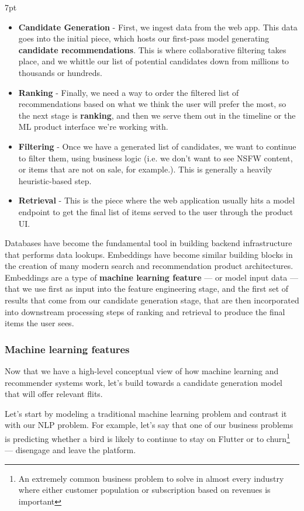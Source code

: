 \documentclass[11pt, table]{diazessay} %
\newenvironment{formal}{%
  \def\FrameCommand{%
	\hspace{1pt}%
	{\color{w_lightblue}\vrule width 2pt}%
	{\color{formalshade}\vrule width 4pt}%
	\colorbox{formalshade}%
  }%
  \MakeFramed{\advance\hsize-\width\FrameRestore}%
  \noindent\hspace{-4.55pt}%
  \begin{adjustwidth}{}{7pt}%
  \vspace{2pt}\vspace{2pt}%
}
{%
  \vspace{2pt}\end{adjustwidth}\endMakeFramed%
}
\begin{document}
\begin{sloppypar}
\begin{formal}
\begin{itemize}
  \item \textbf{Candidate Generation} - First, we ingest data from the web app.  This data goes into the initial piece, which hosts our first-pass model generating \textbf{candidate recommendations}. This is where collaborative filtering takes place, and we whittle our list of potential candidates down from millions to thousands or hundreds.
  \item \textbf{Ranking} - Finally, we need a way to order the filtered list of recommendations based on what we think the user will prefer the most, so the next stage is \textbf{ranking}, and then we serve them out in the timeline or the ML product interface we're working with.
  \item \textbf{Filtering} - Once we have a generated list of candidates, we want to continue to filter them, using business logic (i.e. we don't want to see NSFW content, or items that are not on sale, for example.). This is generally a heavily heuristic-based step.
  \item \textbf{Retrieval} - This is the piece where the web application usually hits a model endpoint to get the final list of items served to the user through the product UI.
\end{itemize}
\end{formal}
    
Databases have become the fundamental tool in building backend infrastructure that performs data lookups. Embeddings have become similar building blocks in the creation of many modern search and recommendation product architectures. Embeddings are a type of \textbf{machine learning feature} --- or model input data --- that we use first as input into the feature engineering stage, and the first set of results that come from our candidate generation stage, that are then incorporated into downstream processing steps of ranking and retrieval to produce the final items the user sees.

\subsubsection{Machine learning features}

Now that we have a high-level conceptual view of how machine learning and recommender systems work, let's build towards a candidate generation model that will offer relevant flits.

Let's start by modeling a traditional machine learning problem and contrast it with our NLP problem. For example, let's say that one of our business problems is predicting whether a bird is likely to continue to stay on Flutter or to churn\footnote{An extremely common business problem to solve in almost every industry where either customer population or subscription based on revenues is important} --- disengage and leave the platform.


\end{sloppypar}
\end{document}
